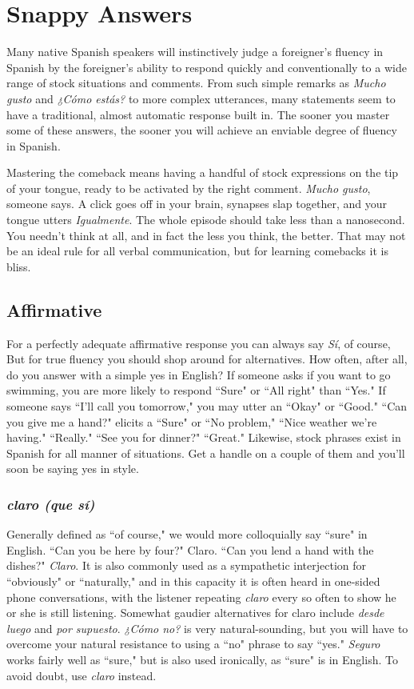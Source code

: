 \chapter{Snappy Answers}

Many native Spanish speakers will instinctively judge a foreigner's fluency in Spanish by the foreigner's ability to respond quickly
and conventionally to a wide range of stock situations and comments.
From such simple remarks as \emph{Mucho gusto} and \emph{¿Cómo estás?} to more
complex utterances, many statements seem to have a traditional, almost automatic response built in. The sooner you master some of
these answers, the sooner you will achieve an enviable degree of fluency in Spanish.

Mastering the comeback means having a handful of stock expressions on the tip of your tongue, ready to be activated by the right
comment. \emph{Mucho gusto}, someone says. A click goes off in your brain,
synapses slap together, and your tongue utters \emph{Igualmente}. The whole
episode should take less than a nanosecond. You needn't think at all,
and in fact the less you think, the better. That may not be an ideal rule
for all verbal communication, but for learning comebacks it is bliss.

\section{Affirmative}

For a perfectly adequate affirmative response you can always
say \emph{Sí}, of course, But for true fluency you should shop around for alternatives. How often, after all, do you answer with a simple yes in
English? If someone asks if you want to go swimming, you are more
likely to respond ``Sure" or ``All right" than ``Yes." If someone says ``I'll
call you tomorrow," you may utter an ``Okay" or ``Good." ``Can you
give me a hand?" elicits a ``Sure" or ``No problem," ``Nice weather
we're having." ``Really." ``See you for dinner?" ``Great." Likewise,
stock phrases exist in Spanish for all manner of situations. Get a
handle on a couple of them and you'll soon be saying yes in style.

\subsection{\emph{claro (que sí)}}

Generally defined as ``of course," we would more colloquially
say ``sure" in English. ``Can you be here by four?" Claro. ``Can you
lend a hand with the dishes?" \emph{Claro}. It is also commonly used as a
sympathetic interjection for ``obviously" or ``naturally," and in this capacity it is often heard in one-sided phone conversations, with the listener repeating \emph{claro} every so often to show he or she is still listening.
Somewhat gaudier alternatives for claro include \emph{desde luego} and \emph{por
	supuesto}. \emph{¿Cómo no?} is very natural-sounding, but you will have to
overcome your natural resistance to using a ``no" phrase to say ``yes."
\emph{Seguro} works fairly well as ``sure," but is also used ironically, as ``sure"
is in English. To avoid doubt, use \emph{claro} instead.

